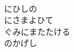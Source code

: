 \documentclass[10pt,b5j]{tarticle} %
\begin{document}
\begin{enumerate}
\begin{minipage}[c]{\blocksize}
        \vspace{\linespace}
        \item~\\
        にひしの\\
        にさまよひて\\
        ぐみにまたたける\\
        のかげし
    
    \end{minipage}
\end{enumerate} %
\end{document}
